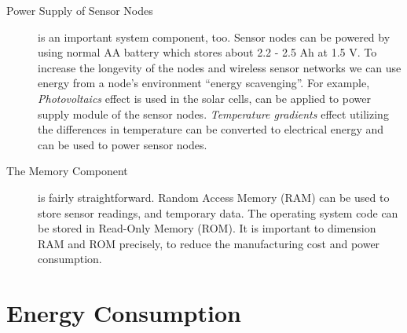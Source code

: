 \begin{description}
	\item[Power Supply of Sensor Nodes] is an important system component, too.
		Sensor nodes can be powered by using normal AA battery which stores about 2.2 - 2.5 Ah at 1.5 V.
		To increase the longevity of the nodes and wireless sensor networks we can use energy from a node’s environment ``energy scavenging''.
		For example, \textit{Photovoltaics} effect is used in the solar cells, can be applied to power supply module of the sensor nodes.
		\textit{Temperature gradients} effect utilizing the differences in temperature can be converted to electrical energy and can be used to power sensor nodes.

	\item[The Memory Component] is fairly straightforward. 
		Random Access Memory (RAM) can be used to store sensor readings, and temporary data. 
		The operating system code can be stored in Read-Only Memory (ROM). 
		It is important to dimension RAM and ROM precisely, to reduce the manufacturing cost and power consumption.
	\end{description}

\section{Energy Consumption}

